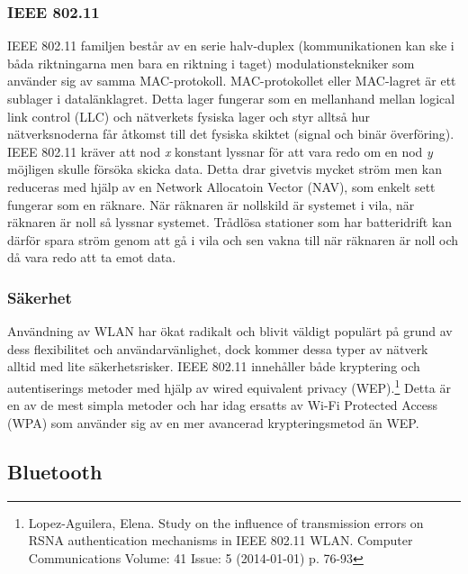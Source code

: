 \documentclass[a4paper,12pt,fleqn]{article}
\begin{document}
\subsubsection{IEEE 802.11}
IEEE 802.11 familjen består av en serie halv-duplex (kommunikationen kan ske i båda riktningarna men bara en riktning i taget) modulationstekniker som använder sig av samma MAC-protokoll. MAC-protokollet eller MAC-lagret är ett sublager i datalänklagret. Detta lager fungerar som en mellanhand mellan logical link control (LLC) och nätverkets fysiska lager och styr alltså hur nätverksnoderna får åtkomst till det fysiska skiktet (signal och binär överföring).
IEEE 802.11 kräver att nod \emph{x} konstant lyssnar för att vara redo om en nod \emph{y} möjligen skulle försöka skicka data. Detta drar givetvis mycket ström men kan reduceras med hjälp av en Network Allocatoin Vector (NAV), som enkelt sett fungerar som en räknare. När räknaren är nollskild är systemet i vila, när räknaren är noll så lyssnar systemet. Trådlösa stationer som har batteridrift kan därför spara ström genom att gå i vila och sen vakna till när räknaren är noll och då vara redo att ta emot data. 

\subsubsection{Säkerhet}
Användning av WLAN har ökat radikalt och blivit väldigt populärt på grund av dess flexibilitet och användarvänlighet, dock kommer dessa typer av nätverk alltid med lite säkerhetsrisker. IEEE 802.11 innehåller både kryptering och autentiserings metoder med hjälp av wired equivalent privacy (WEP).\footnote{Lopez-Aguilera, Elena. Study on the influence of transmission errors on RSNA authentication mechanisms in IEEE 802.11 WLAN. Computer Communications Volume: 41 Issue: 5 (2014-01-01) p. 76-93} Detta är en av de mest simpla metoder och har idag ersatts av  Wi-Fi Protected Access (WPA) som använder sig av en mer avancerad krypteringsmetod än WEP. 

\subsection{Bluetooth}
\end{document}
